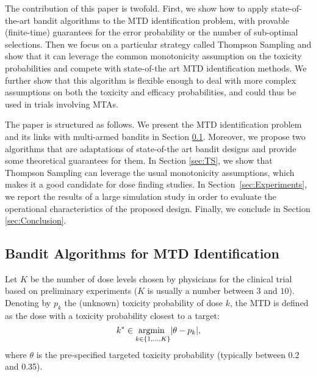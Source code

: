 
The contribution of this paper is twofold. First, we show how to apply state-of-the-art bandit algorithms to the MTD identification problem, with provable (finite-time) guarantees for the error probability or the number of sub-optimal selections. Then we focus on a particular strategy called Thompson Sampling and show that it can leverage the common monotonicity assumption on the toxicity probabilities and compete with state-of-the art MTD identification methods. We further show that this algorithm is flexible enough to deal with more complex assumptions on both the toxicity and efficacy probabilities, and could thus be used in trials involving MTAs.   

The paper is structured as follows. We present the MTD identification problem and its links with multi-armed bandits in Section \ref{sec:Bandits}. Moreover, we propose two algorithms that are adaptations of state-of-the art bandit designs and provide some theoretical guarantees for them. In Section \ref{sec:TS}, we show that Thompson Sampling can leverage the usual monotonicity assumptions, which makes it a good candidate for dose finding studies. In Section~\ref{sec:Experiments}, we report the results of a large simulation study in order to evaluate the operational characteristics of the proposed design. Finally, we conclude in Section \ref{sec:Conclusion}.

\subsection{Bandit Algorithms for MTD Identification} \label{sec:Bandits}

Let $K$ be the number of dose levels chosen by physicians for the clinical trial based on preliminary experiments ($K$ is usually a number between $3$ and $10$). Denoting by $p_k$ the (unknown) toxicity probability of dose $k$, the MTD is defined as the dose with a toxicity probability closest to a target:
\[k^* \in \underset{k \in \{1,\dots,K\}}{\text{argmin }} |\theta - p_k|,\]
where $\theta$ is the pre-specified targeted toxicity probability (typically between 0.2 and 0.35). 

